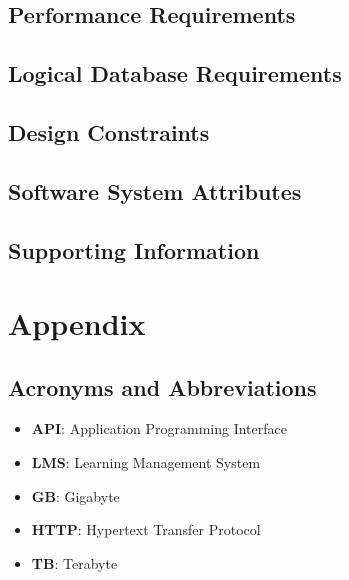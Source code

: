 \documentclass[ 10pt]{report}
\begin{document}
        \section{Performance Requirements}
        \section{Logical Database Requirements}
        \section{Design Constraints}
        \section{Software System Attributes}
        \section{Supporting Information}
    \pagebreak


    \chapter{Appendix}
        \section{Acronyms and Abbreviations}
        \begin{itemize}
            \item \textbf{API}: Application Programming Interface
            \item \textbf{LMS}: Learning Management System
            \item \textbf{GB}: Gigabyte
            \item \textbf{HTTP}: Hypertext Transfer Protocol
            \item \textbf{TB}: Terabyte
        \end{itemize}


\end{document}
